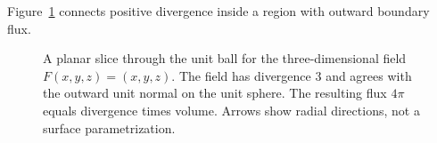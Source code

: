 Figure~\ref{fig:atlas-outward-flux} connects positive divergence inside a region with outward boundary flux.

\begin{figure}[!htbp]
\centering
{}
\caption{A planar slice through the unit ball for the three-dimensional field $F(x,y,z)=(x,y,z)$. The field has divergence $3$ and agrees with the outward unit normal on the unit sphere. The resulting flux $4\pi$ equals divergence times volume. Arrows show radial directions, not a surface parametrization.}
\label{fig:atlas-outward-flux}
\end{figure}